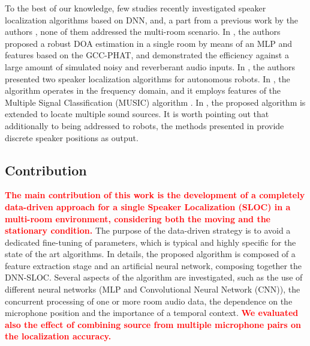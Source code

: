 \documentclass[review]{elsarticle}
\begin{document}




To the best of our knowledge, few studies recently investigated speaker localization algorithms based on DNN, and, a part from a previous work by the authors \cite{vesperini2016sloc}, none of them addressed the multi-room scenario. In \cite{xiao2015learning}, the authors proposed a robust DOA estimation in a single room by means of an MLP and features based on the GCC-PHAT, and demonstrated the efficiency against a large amount of simulated noisy and reverberant audio inputs. In \cite{Takeda2016a,Takeda2016b}, the authors presented two speaker localization algorithms for autonomous robots. In \cite{Takeda2016a}, the algorithm operates in the frequency domain, and it employs features of the Multiple Signal Classification (MUSIC) algorithm \cite{Schmidt86}. In \cite{Takeda2016b}, the proposed algorithm is extended to locate multiple sound sources. It is worth pointing out that additionally to being addressed to robots, the methods presented in \cite{Takeda2016a,Takeda2016b} provide discrete speaker positions as output.


\subsection{Contribution}
\textcolor{red}{\textbf{The main contribution of this work is the development of a completely data-driven approach for a single Speaker Localization (SLOC) in a multi-room environment, considering both the moving and the stationary condition.}}
The purpose of the data-driven strategy is to avoid a dedicated fine-tuning of parameters, which is typical and highly specific for the state of the art algorithms.
In details, the proposed algorithm is composed of a feature extraction stage and an artificial neural network, composing together the DNN-SLOC.
Several aspects of the algorithm are investigated, such as the use of different neural networks (MLP and Convolutional Neural Network (CNN)), the concurrent processing of one or more room audio data, the dependence on the microphone position and the importance of a temporal context.
\textcolor{red}{\textbf{We evaluated also the effect of combining source from multiple microphone pairs on the localization accuracy.}}
\end{document}
